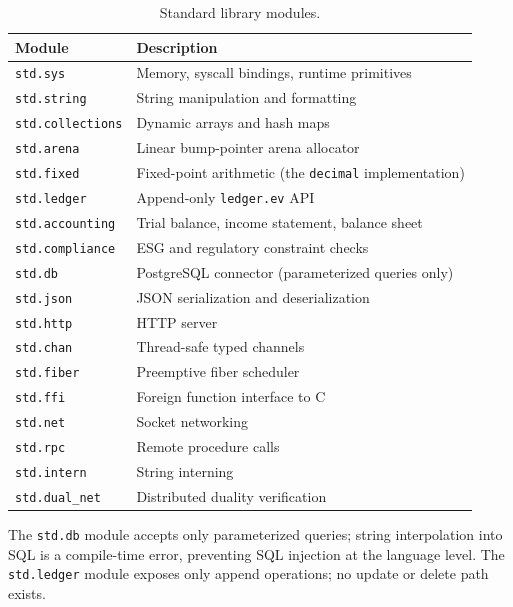 \documentclass[11pt,a4paper]{article}
\theoremstyle{remark}
\begin{document}
\begin{table}[ht]
\caption{Standard library modules.}
\label{tab:stdlib}
\centering
\small
\begin{tabular}{@{}ll@{}}
\toprule
Module & Description \\
\midrule
\texttt{std.sys}         & Memory, syscall bindings, runtime primitives \\
\texttt{std.string}      & String manipulation and formatting \\
\texttt{std.collections} & Dynamic arrays and hash maps \\
\texttt{std.arena}       & Linear bump-pointer arena allocator \\
\texttt{std.fixed}       & Fixed-point arithmetic (the \texttt{decimal} implementation) \\
\texttt{std.ledger}      & Append-only \texttt{ledger.ev} API \\
\texttt{std.accounting}  & Trial balance, income statement, balance sheet \\
\texttt{std.compliance}  & ESG and regulatory constraint checks \\
\texttt{std.db}          & PostgreSQL connector (parameterized queries only) \\
\texttt{std.json}        & JSON serialization and deserialization \\
\texttt{std.http}        & HTTP server \\
\texttt{std.chan}        & Thread-safe typed channels \\
\texttt{std.fiber}       & Preemptive fiber scheduler \\
\texttt{std.ffi}         & Foreign function interface to C \\
\texttt{std.net}         & Socket networking \\
\texttt{std.rpc}         & Remote procedure calls \\
\texttt{std.intern}      & String interning \\
\texttt{std.dual\_net}   & Distributed duality verification \\
\bottomrule
\end{tabular}
\end{table}

The \texttt{std.db} module accepts only parameterized queries; string
interpolation into SQL is a compile-time error, preventing SQL injection
at the language level. The \texttt{std.ledger} module exposes only
append operations; no update or delete path exists.
\end{document}
